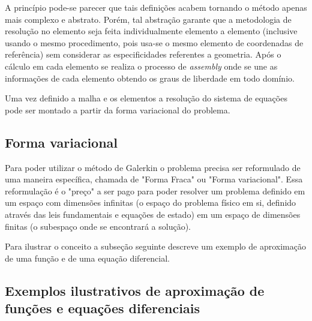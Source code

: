     A princípio pode-se parecer que tais definições acabem tornando o método
    apenas mais complexo e abstrato. Porém, tal abstração garante que a
    metodologia de resolução no elemento seja feita individualmente elemento a
    elemento (inclusive usando o mesmo procedimento, pois usa-se o mesmo
    elemento de coordenadas de referência) sem considerar as especificidades
    referentes a geometria. Após o cálculo em cada elemento se realiza o
    processo de \textit{assembly} onde se une as informações de cada elemento
    obtendo os graus de liberdade em todo domínio.

    Uma vez definido a malha e os elementos a resolução do sistema de equações
    pode ser montado a partir da forma variacional do problema.

    \subsection{Forma variacional}
        Para poder utilizar o método de Galerkin o problema precisa ser reformulado
    de uma maneira específica, chamada de "Forma Fraca" ou "Forma variacional".
    Essa reformulação é o "preço" a ser pago para poder resolver um problema
    definido em um espaço com dimensões infinitas (o espaço do problema físico
    em si, definido através das leis fundamentais e equações de estado) em um
    espaço de dimensões finitas (o subespaço onde se encontrará a solução).

    Para ilustrar o conceito a subseção seguinte descreve um exemplo de
    aproximação de uma função e de uma equação diferencial.

    \subsection{Exemplos ilustrativos de aproximação de funções e equações
      diferenciais}

    
   

